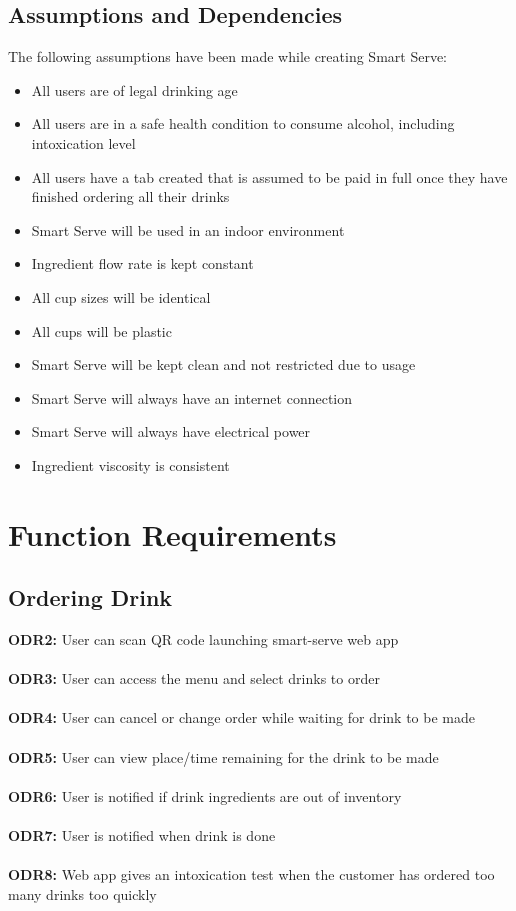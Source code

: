 \documentclass{article}
\begin{document}
\subsection{Assumptions and Dependencies} %
    The following assumptions have been made while creating Smart Serve:
    \begin{itemize}
        \item All users are of legal drinking age
        \item All users are in a safe health condition to consume alcohol, including intoxication level
        \item All users have a tab created that is assumed to be paid in full once they have finished ordering all their drinks
        \item Smart Serve will be used in an indoor environment
        \item Ingredient flow rate is kept constant
        \item All cup sizes will be identical
        \item All cups will be plastic
        \item Smart Serve will be kept clean and not restricted due to usage
        \item Smart Serve will always have an internet connection
        \item Smart Serve will always have electrical power
        \item Ingredient viscosity is consistent
    \end{itemize}

\section{Function Requirements}
\subsection{Ordering Drink}
    \noindent\textbf{ODR2:} User can scan QR code launching smart-serve web app \\\\ 
    \textbf{ODR3:} User can access the menu and select drinks to order\\\\ 
    \textbf{ODR4:} User can cancel or change order while waiting for drink to be made \\\\ 
    \textbf{ODR5:} User can view place/time remaining for the drink to be made \\\\ 
    \textbf{ODR6:} User is notified if drink ingredients are out of inventory\\\\ 
    \textbf{ODR7:} User is notified when drink is done\\\\
    \textbf{ODR8:} Web app gives an intoxication test when the customer has ordered too many drinks too quickly\\
\end{document}
